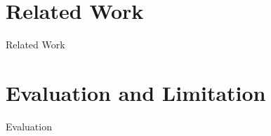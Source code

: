 \documentclass{sig-alternate-ipsn13}
\begin{document}

\section{Related Work}
Related Work


\section{Evaluation and Limitation}
Evaluation
\end{document}
